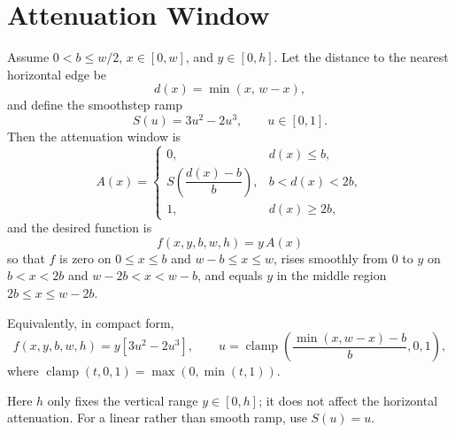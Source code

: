 \documentclass[11pt]{article}
\begin{document}
\section*{Attenuation Window}

Assume \(0<b\le w/2\), \(x\in[0,w]\), and \(y\in[0,h]\). Let the distance
to the nearest horizontal edge be
\[
  d(x)=\min(x,\,w-x),
\]
and define the smoothstep ramp
\[
  S(u)=3u^{2}-2u^{3},\qquad u\in[0,1].
\]
Then the attenuation window is
\[
  A(x)=
  \begin{cases}
    0, & d(x)\le b,\\[4pt]
    S\!\left(\dfrac{d(x)-b}{b}\right), & b<d(x)<2b,\\[10pt]
    1, & d(x)\ge 2b,
  \end{cases}
\]
and the desired function is
\[
  \boxed{
    f(x,y,b,w,h)=y\,A(x)
  }
\]
so that \(f\) is zero on \(0\le x\le b\) and \(w-b\le x\le w\), rises
smoothly from \(0\) to \(y\) on \(b<x<2b\) and \(w-2b<x<w-b\), and equals
\(y\) in the middle region \(2b\le x\le w-2b\).

Equivalently, in compact form,
\[
  f(x,y,b,w,h)
  =
  y\left[3u^{2}-2u^{3}\right],
  \qquad
  u=\operatorname{clamp}\!\left(\frac{\min(x,w-x)-b}{b},0,1\right),
\]
where \(\operatorname{clamp}(t,0,1)=\max(0,\min(t,1))\).

Here \(h\) only fixes the vertical range \(y\in[0,h]\); it does not affect
the horizontal attenuation. For a linear rather than smooth ramp, use
\(S(u)=u\).
\end{document}
